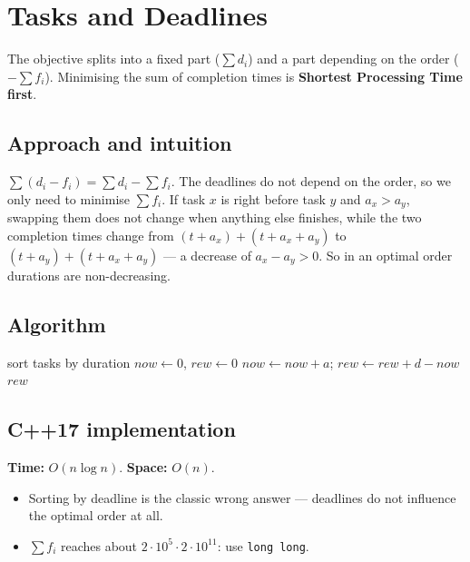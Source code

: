 \section{Tasks and Deadlines}
\label{sec:g-tasks-deadlines}


\begin{patternbox}
The objective splits into a fixed part ($\sum d_i$) and a part depending on
the order ($-\sum f_i$). Minimising the sum of completion times is
\textbf{Shortest Processing Time first}.
\end{patternbox}

\subsection*{Approach and intuition}

$\sum(d_i-f_i)=\sum d_i-\sum f_i$. The deadlines do not depend on the order,
so we only need to minimise $\sum f_i$. If task $x$ is right before task $y$
and $a_x>a_y$, swapping them does not change when anything else finishes,
while the two completion times change from $(t+a_x)+(t+a_x+a_y)$ to
$(t+a_y)+(t+a_x+a_y)$ --- a decrease of $a_x-a_y>0$. So in an optimal order
durations are non-decreasing.

\subsection*{Algorithm}
\begin{algorithmic}[1]
\State sort tasks by duration
\State $now\gets0$, $rew\gets0$
 \State $now\gets now+a$; $rew\gets rew+d-now$ \EndFor
\State \Return $rew$
\end{algorithmic}


\subsection*{C++17 implementation}

\begin{complexitybox}
\textbf{Time:} $O(n\log n)$. \textbf{Space:} $O(n)$.
\end{complexitybox}

\begin{pitfallbox}
\begin{itemize}
  \item Sorting by deadline is the classic wrong answer --- deadlines do
        not influence the optimal order at all.
  \item $\sum f_i$ reaches about $2\cdot10^5\cdot2\cdot10^{11}$: use
        \texttt{long long}.
\end{itemize}
\end{pitfallbox}
